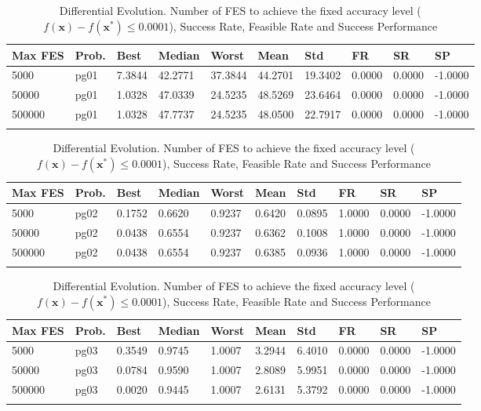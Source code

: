 \documentclass[10pt, a4paper]{book}
\begin{document}
\begin{center}
\begin{longtable}{l l l l l l l l l l}
\textbf{Max FES} & \textbf{Prob.} & \textbf{Best} & \textbf{Median} & \textbf{Worst} & \textbf{Mean} & \textbf{Std} & \textbf{FR} & \textbf{SR} & \textbf{SP} \\
\hline
5000 & pg01 & 7.3844 & 42.2771 & 37.3844 & 44.2701 & 19.3402 & 0.0000 & 0.0000 & -1.0000 \\
50000 & pg01 & 1.0328 & 47.0339 & 24.5235 & 48.5269 & 23.6464 & 0.0000 & 0.0000 & -1.0000 \\
500000 & pg01 & 1.0328 & 47.7737 & 24.5235 & 48.0500 & 22.7917 & 0.0000 & 0.0000 & -1.0000 \\

\caption{ Differential Evolution. Number of FES to achieve the fixed accuracy level ($f(\mathbf{x}) - f(\mathbf{x}^{*}) \leq 0.0001$), Success Rate, Feasible Rate and Success Performance }
\end{longtable}
\end{center}

\begin{center}
\begin{longtable}{l l l l l l l l l l}
\textbf{Max FES} & \textbf{Prob.} & \textbf{Best} & \textbf{Median} & \textbf{Worst} & \textbf{Mean} & \textbf{Std} & \textbf{FR} & \textbf{SR} & \textbf{SP} \\
\hline
5000 & pg02 & 0.1752 & 0.6620 & 0.9237 & 0.6420 & 0.0895 & 1.0000 & 0.0000 & -1.0000 \\
50000 & pg02 & 0.0438 & 0.6554 & 0.9237 & 0.6362 & 0.1008 & 1.0000 & 0.0000 & -1.0000 \\
500000 & pg02 & 0.0438 & 0.6554 & 0.9237 & 0.6385 & 0.0936 & 1.0000 & 0.0000 & -1.0000 \\

\caption{ Differential Evolution. Number of FES to achieve the fixed accuracy level ($f(\mathbf{x}) - f(\mathbf{x}^{*}) \leq 0.0001$), Success Rate, Feasible Rate and Success Performance }
\end{longtable}
\end{center}

\begin{center}
\begin{longtable}{l l l l l l l l l l}
\textbf{Max FES} & \textbf{Prob.} & \textbf{Best} & \textbf{Median} & \textbf{Worst} & \textbf{Mean} & \textbf{Std} & \textbf{FR} & \textbf{SR} & \textbf{SP} \\
\hline
5000 & pg03 & 0.3549 & 0.9745 & 1.0007 & 3.2944 & 6.4010 & 0.0000 & 0.0000 & -1.0000 \\
50000 & pg03 & 0.0784 & 0.9590 & 1.0007 & 2.8089 & 5.9951 & 0.0000 & 0.0000 & -1.0000 \\
500000 & pg03 & 0.0020 & 0.9445 & 1.0007 & 2.6131 & 5.3792 & 0.0000 & 0.0000 & -1.0000 \\

\caption{ Differential Evolution. Number of FES to achieve the fixed accuracy level ($f(\mathbf{x}) - f(\mathbf{x}^{*}) \leq 0.0001$), Success Rate, Feasible Rate and Success Performance }
\end{longtable}
\end{center}
\end{document}
